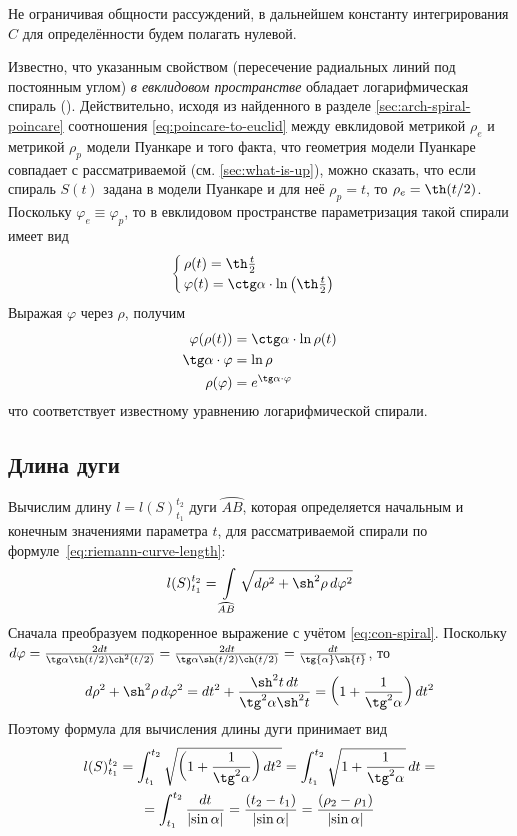 \documentclass{article}
\numberwithin{equation}{section}
\renewcommand{\phi}{\varphi}
\providecommand{\arc}[1]{\wideparen{#1}}
\providecommand{\abs}[1]{\left \lvert{#1}\right \rvert}
\begin{document}
Не ограничивая общности рассуждений, в дальнейшем константу
интегрирования $C$ для определённости будем полагать нулевой.

Известно, что указанным свойством (пересечение радиальных линий под
постоянным углом) \emph{в евклидовом пространстве} обладает
логарифмическая спираль (\cite{klein39}). Действительно, исходя из
найденного в разделе \ref{sec:arch-spiral-poincare} соотношения
\eqref{eq:poincare-to-euclid} между евклидовой метрикой $\rho_e$ и
метрикой $\rho_p$ модели Пуанкаре и того факта, что геометрия модели
Пуанкаре совпадает с рассматриваемой (см. \ref{sec:what-is-up}), можно
сказать, что если спираль $S(t)$ задана в модели Пуанкаре и для неё
$\rho_p = t$, то $\rho_e=\th(t/2)$. Поскольку $\phi_e \equiv \phi_p$,
то в евклидовом пространстве параметризация такой спирали имеет вид
\begin{equation*}
  \begin{cases}
    \rho(t) = \th\frac{t}{2} \\
    \phi(t) = \ctg\alpha \cdot \ln\left(\th\frac{t}{2}\right)
  \end{cases}
\end{equation*}
Выражая $\phi$ через $\rho$, получим
\begin{equation*}
  \begin{split}
    \phi(\rho(t)) &= \ctg\alpha \cdot \ln{\rho(t)} \\
    \tg\alpha \cdot \phi &= \ln\rho \\
    \rho(\phi) &= e^{\tg\alpha \cdot \phi}
  \end{split}
\end{equation*}
что соответствует известному уравнению логарифмической спирали.

\subsection{Длина дуги}

Вычислим длину $l=l(S)_{t_1}^{t_2}$ дуги $\arc{AB}$, которая
определяется начальным и конечным значениями параметра $t$, для
рассматриваемой спирали по формуле \eqref{eq:riemann-curve-length}:
\begin{equation*}
  l(S)_{t_1}^{t_2} = \int \limits_{\arc{AB}}{\sqrt{d\rho^2+\sh^2\rho\,d\phi^2}}
\end{equation*}
Сначала преобразуем подкоренное выражение с учётом
\eqref{eq:con-spiral}. Поскольку $d\phi = \frac{2 dt}{\tg\alpha
  \th(t/2) \ch^2(t/2)} = \frac{2 dt}{\tg\alpha \sh(t/2)
  \ch(t/2)}=\frac{dt}{\tg{\alpha}\sh{t}}$, то
\begin{equation*}  
  d\rho^2+\sh^2\rho\, d\phi^2 =
  dt^2 + \frac{\sh^2{t}\, dt}{\tg^2{\alpha}\sh^2{t}}
  =\left(1+\frac{1}{\tg^2{\alpha}}\right)dt^2
\end{equation*}
Поэтому формула для вычисления длины дуги принимает вид
\begin{multline}
  l(S)_{t_1}^{t_2} =
  \int_{t_1}^{t_2}\sqrt{\left(1+\frac{1}{\tg^2{\alpha}}\right)dt^2} =
  \int_{t_1}^{t_2}\sqrt{1+\frac{1}{\tg^2{\alpha}}}\,dt = \\
  = \int_{t_1}^{t_2}\frac{dt}{\abs{\sin\alpha}} =
  \frac{(t_2 - t_1)}{\abs{\sin\alpha}} = \frac{(\rho_2 - \rho_1)}{\abs{\sin\alpha}}
\end{multline}
\end{document}
